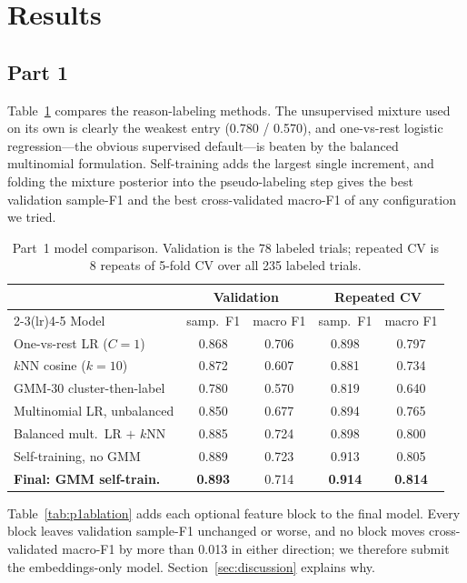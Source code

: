 \section{Results}
\label{sec:results}

\subsection{Part 1}

Table~\ref{tab:p1models} compares the reason-labeling methods. The unsupervised
mixture used on its own is clearly the weakest entry (0.780 / 0.570), and
one-vs-rest logistic regression---the obvious supervised default---is beaten by
the balanced multinomial formulation. Self-training adds the largest single
increment, and folding the mixture posterior into the pseudo-labeling step gives
the best validation sample-F1 and the best cross-validated macro-F1 of any
configuration we tried.

\begin{table}[t]
\centering\small
\setlength{\tabcolsep}{4pt}
\begin{tabular}{lcccc}
\toprule
& \multicolumn{2}{c}{Validation} & \multicolumn{2}{c}{Repeated CV} \\
\cmidrule(lr){2-3}\cmidrule(lr){4-5}
Model & samp.\ F1 & macro F1 & samp.\ F1 & macro F1 \\
\midrule
One-vs-rest LR ($C{=}1$)        & 0.868 & 0.706 & 0.898 & 0.797 \\
$k$NN cosine ($k{=}10$)         & 0.872 & 0.607 & 0.881 & 0.734 \\
GMM-30 cluster-then-label       & 0.780 & 0.570 & 0.819 & 0.640 \\
Multinomial LR, unbalanced      & 0.850 & 0.677 & 0.894 & 0.765 \\
Balanced mult.\ LR $+$ $k$NN    & 0.885 & 0.724 & 0.898 & 0.800 \\
Self-training, no GMM           & 0.889 & 0.723 & 0.913 & 0.805 \\
\textbf{Final: GMM self-train.} & \textbf{0.893} & 0.714 & \textbf{0.914} & \textbf{0.814} \\
\bottomrule
\end{tabular}
\caption{Part~1 model comparison. Validation is the 78 labeled trials; repeated CV
is 8 repeats of 5-fold CV over all 235 labeled trials.}
\label{tab:p1models}
\end{table}

Table~\ref{tab:p1ablation} adds each optional feature block to the final model.
Every block leaves validation sample-F1 unchanged or worse, and no block moves
cross-validated macro-F1 by more than 0.013 in either direction; we therefore
submit the embeddings-only model. Section~\ref{sec:discussion} explains why.

